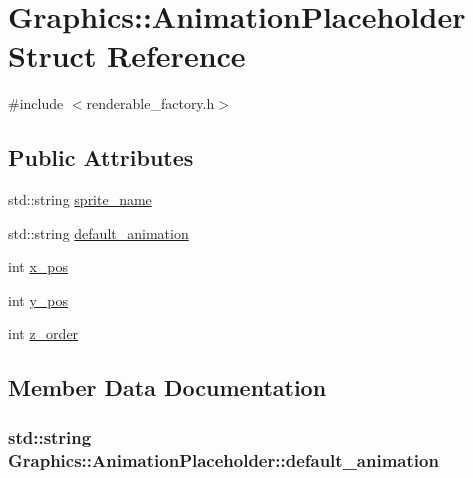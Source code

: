 \hypertarget{struct_graphics_1_1_animation_placeholder}{}\section{Graphics\+:\+:Animation\+Placeholder Struct Reference}
\label{struct_graphics_1_1_animation_placeholder}


{\ttfamily \#include $<$renderable\+\_\+factory.\+h$>$}

\subsection*{Public Attributes}
\begin{DoxyCompactItemize}
\item 
std\+::string \hyperlink{struct_graphics_1_1_animation_placeholder_aa6d0960d3bf182a8ce0047c2c2a180ed}{sprite\+\_\+name}
\item 
std\+::string \hyperlink{struct_graphics_1_1_animation_placeholder_ad5eae21e0490c802c1cf3e890e9000a8}{default\+\_\+animation}
\item 
int \hyperlink{struct_graphics_1_1_animation_placeholder_aed910a3665ceb34c24ea8daaac2b8d6f}{x\+\_\+pos}
\item 
int \hyperlink{struct_graphics_1_1_animation_placeholder_ad65e0d16937e548f1a4cc09c1d6e973a}{y\+\_\+pos}
\item 
int \hyperlink{struct_graphics_1_1_animation_placeholder_acc9e536b7002c04adc264abf55d51225}{z\+\_\+order}
\end{DoxyCompactItemize}


\subsection{Member Data Documentation}
\hypertarget{struct_graphics_1_1_animation_placeholder_ad5eae21e0490c802c1cf3e890e9000a8}{}
\subsubsection[{default\+\_\+animation}]{\setlength{\rightskip}{0pt plus 5cm}std\+::string Graphics\+::\+Animation\+Placeholder\+::default\+\_\+animation}\label{struct_graphics_1_1_animation_placeholder_ad5eae21e0490c802c1cf3e890e9000a8}
\hypertarget{struct_graphics_1_1_animation_placeholder_aa6d0960d3bf182a8ce0047c2c2a180ed}{}
